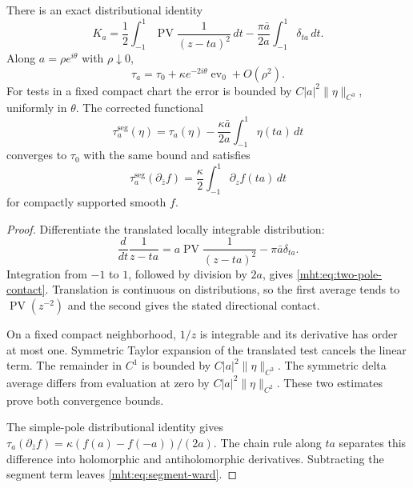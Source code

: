 \begin{theorem}\label{mht:thm:two-pole-contact}
There is an exact distributional identity
\begin{equation}\label{mht:eq:two-pole-contact}
 K_a=\frac12\int_{-1}^{1}
       \operatorname{PV}\frac1{(z-ta)^2}\,dt
       -\frac{\pi\bar a}{2a}\int_{-1}^{1}\delta_{ta}\,dt.
\end{equation}
Along $a=\rho e^{i\theta}$ with $\rho\downarrow0$,
\[
 \tau_a=\tau_0+\kappa e^{-2i\theta}\operatorname{ev}_0
         +O(\rho^2).
\]
For tests in a fixed compact chart the error is bounded by
$C|a|^2\|\eta\|_{C^3}$, uniformly in $\theta$.
The corrected functional
\begin{equation}\label{mht:eq:segment-corrected-trace}
 \tau_a^{\mathrm{seg}}(\eta)
   =\tau_a(\eta)-\frac{\kappa\bar a}{2a}
                            \int_{-1}^{1}\eta(ta)\,dt
\end{equation}
converges to $\tau_0$ with the same bound and satisfies
\begin{equation}\label{mht:eq:segment-ward}
 \tau_a^{\mathrm{seg}}(\partial_{\bar z}f)
   =\frac\kappa2\int_{-1}^{1}\partial_zf(ta)\,dt
\end{equation}
for compactly supported smooth $f$.
\end{theorem}

\begin{proof}
Differentiate the translated locally integrable distribution:
\[
 \frac{d}{dt}\frac1{z-ta}
   =a\operatorname{PV}\frac1{(z-ta)^2}-\pi\bar a\delta_{ta}.
\]
Integration from $-1$ to $1$, followed by division by $2a$,
gives \eqref{mht:eq:two-pole-contact}. Translation is
continuous on distributions, so the first average tends to
$\operatorname{PV}(z^{-2})$ and the second gives the stated
directional contact.

On a fixed compact neighborhood, $1/z$ is integrable and
its derivative has order at most one. Symmetric Taylor
expansion of the translated test cancels the linear term.
The remainder in $C^1$ is bounded by
$C|a|^2\|\eta\|_{C^3}$. The symmetric delta average differs
from evaluation at zero by $C|a|^2\|\eta\|_{C^2}$.
These two estimates prove both convergence bounds.

The simple-pole distributional identity gives
$\tau_a(\partial_{\bar z}f)=\kappa(f(a)-f(-a))/(2a)$.
The chain rule along $ta$ separates this difference into
holomorphic and antiholomorphic derivatives. Subtracting
the segment term leaves \eqref{mht:eq:segment-ward}.
\end{proof}


